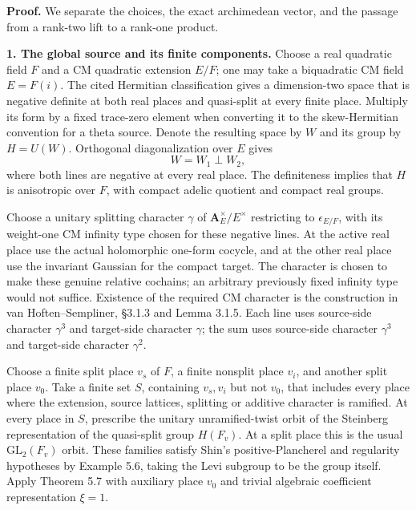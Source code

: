 \textbf{Proof.} We separate the choices, the exact archimedean vector, and the passage from a rank-two lift to a rank-one product.

\textbf{1. The global source and its finite components.} Choose a real quadratic field \(F\) and a CM quadratic extension \(E/F\); one may take a biquadratic CM field \(E=F(i)\). The cited Hermitian classification gives a dimension-two space that is negative definite at both real places and quasi-split at every finite place. Multiply its form by a fixed trace-zero element when converting it to the skew-Hermitian convention for a theta source. Denote the resulting space by \(W\) and its group by \(H=U(W)\). Orthogonal diagonalization over \(E\) gives \[
W=W_1\perp W_2,
\] where both lines are negative at every real place. The definiteness implies that \(H\) is anisotropic over \(F\), with compact adelic quotient and compact real groups.

Choose a unitary splitting character \(\gamma\) of \(\mathbf A_E^\times/E^\times\) restricting to \(\epsilon_{E/F}\), with its weight-one CM infinity type chosen for these negative lines. At the active real place use the actual holomorphic one-form cocycle, and at the other real place use the invariant Gaussian for the compact target. The character is chosen to make these genuine relative cochains; an arbitrary previously fixed infinity type would not suffice. Existence of the required CM character is the construction in van Hoften--Sempliner, §3.1.3 and Lemma 3.1.5. Each line uses source-side character \(\gamma^3\) and target-side character \(\gamma\); the sum uses source-side character \(\gamma^3\) and target-side character \(\gamma^2\).

Choose a finite split place \(v_s\) of \(F\), a finite nonsplit place \(v_i\), and another split place \(v_0\). Take a finite set \(S\), containing \(v_s,v_i\) but not \(v_0\), that includes every place where the extension, source lattices, splitting or additive character is ramified. At every place in \(S\), prescribe the unitary unramified-twist orbit of the Steinberg representation of the quasi-split group \(H(F_v)\). At a split place this is the usual \(\mathrm{GL}_2(F_v)\) orbit. These families satisfy Shin's positive-Plancherel and regularity hypotheses by Example 5.6, taking the Levi subgroup to be the group itself. Apply Theorem 5.7 with auxiliary place \(v_0\) and trivial algebraic coefficient representation \(\xi=1\).


